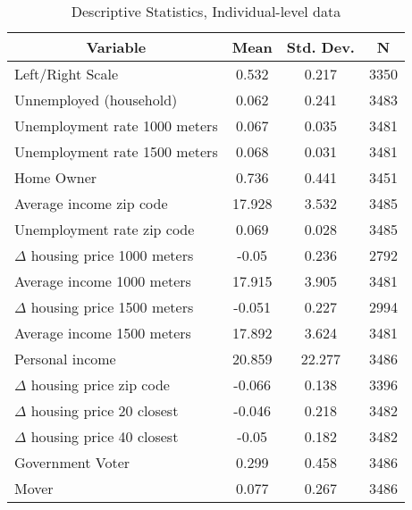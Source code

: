 
\begin{table}[htbp]\centering \caption{Descriptive Statistics, Individual-level data \label{sumstat}}
\begin{tabular}{l c c  c}\hline\hline
\multicolumn{1}{c}{\textbf{Variable}} & \textbf{Mean}
 & \textbf{Std. Dev.} & \textbf{N}\\ \hline
Left/Right Scale & 0.532 & 0.217  & 3350\\
Unnemployed (household) & 0.062 & 0.241  & 3483\\
Unemployment rate 1000 meters & 0.067 & 0.035  & 3481\\
Unemployment rate 1500 meters & 0.068 & 0.031  & 3481\\
Home Owner & 0.736 & 0.441  & 3451\\
Average income zip code & 17.928 & 3.532  & 3485\\
Unemployment rate zip code & 0.069 & 0.028  & 3485\\
$\Delta$ housing price 1000 meters & -0.05 & 0.236  & 2792\\
Average income 1000 meters & 17.915 & 3.905  & 3481\\
$\Delta$ housing price 1500 meters & -0.051 & 0.227  & 2994\\
Average income 1500 meters & 17.892 & 3.624  & 3481\\
Personal income & 20.859 & 22.277  & 3486\\
$\Delta$ housing price zip code & -0.066 & 0.138  & 3396\\
$\Delta$ housing price 20 closest & -0.046 & 0.218  & 3482\\
$\Delta$ housing price 40 closest & -0.05 & 0.182  & 3482\\
Government Voter & 0.299 & 0.458  & 3486\\
Mover & 0.077 & 0.267  & 3486\\
\hline\end{tabular}
\end{table}
